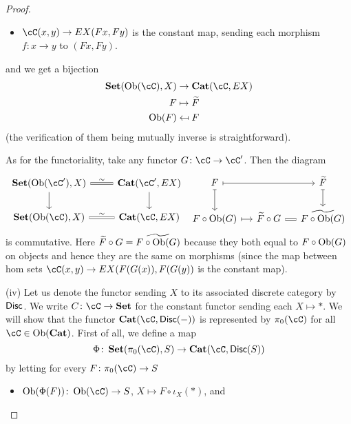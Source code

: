 \documentclass[a4paper,11pt,openany]{scrartcl}
\begin{document}
\begin{proof}
\begin{itemize}
\item $\cC(x,y)\to EX(Fx,Fy)$ is the constant map, sending each morphism $f\colon x\to y$ to $(Fx,Fy)$.
\end{itemize}
and we get a bijection
\begin{align*}
\Set(\Ob(\cC),X)&\to\Cat(\cC,EX)\\
F&\mapsto \widetilde{F}\\
\Ob(F)&\mapsfrom F
\end{align*}
(the verification of them being mutually inverse is straightforward).

As for the functoriality, take any functor $G\colon\cC\to\cC'$. Then the diagram
\[
\begin{tikzcd}
\Set(\Ob(\cC'),X)\arrow[r,equal,"\sim"]\arrow[d]& \Cat(\cC',EX)\arrow[d]\\
\Set(\Ob(\cC),X)\arrow[r,equal,"\sim"]& \Cat(\cC,EX)
\end{tikzcd}
\ 
\begin{tikzcd}[column sep=small]
F\arrow[rr,mapsto]\arrow[d,mapsto]&& \widetilde{F}\arrow[d,mapsto]\\
F\circ\Ob(G)\arrow[r,mapsto]& \widetilde{F}\circ G\arrow[r,equal]& \widetilde{F\circ\Ob(G)}
\end{tikzcd}
\]
is commutative. Here $\widetilde{F}\circ G=\widetilde{F\circ\operatorname{Ob}(G)}$ because they both equal to $F\circ \operatorname{Ob}(G)$ on objects and hence they are the same on morphisms (since the map between hom sets $\cC(x,y)\to EX(F(G(x)),F(G(y))$ is the constant map).

(iv) Let us denote the functor sending $X$ to its associated discrete category by $\operatorname{\mathsf{Disc}}$. We write $C\colon\cC\to\Set$ for the constant functor sending each $X\mapsto *$. We will show that the functor $\Cat(\cC,\Disc(-))$ is represented by $\pi_0(\cC)$ for all $\cC\in\Ob(\Cat)$. First of all, we define a map
\[
\Phi\colon\Set(\pi_0(\cC),S)\to\Cat(\cC,\Disc(S))
\]
by letting for every $F\colon\pi_0(\cC)\to S$ 
\begin{itemize}
\item $\Ob(\Phi(F))\colon\Ob(\cC)\to S$, $X\mapsto F\circ\iota_X(*)$, and


\end{itemize}
\end{proof}
\end{document}
